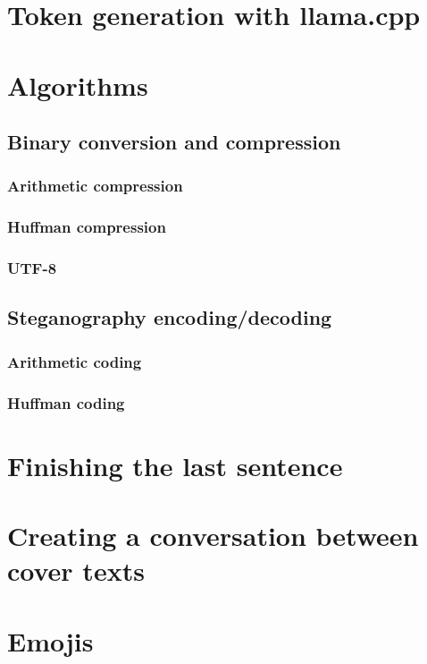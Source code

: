 \section{Token generation with llama.cpp}
\label{sec:tokenGenerationWithLlamaCpp}

\section{Algorithms}
\label{sec:algorithms}

\subsection{Binary conversion and compression}
\label{sec:binaryConversionAndCompression}

\subsubsection{Arithmetic compression}
\label{sec:arithmeticCompression}

\subsubsection{Huffman compression}
\label{sec:huffmanCompression}

\subsubsection{UTF-8}
\label{sec:utf8}

\subsection{Steganography encoding/decoding}
\label{sec:steganographyEncodingDecoding}

\subsubsection{Arithmetic coding}
\label{sec:arithmeticCoding}

\subsubsection{Huffman coding}
\label{sec:huffmanCoding}

\section{Finishing the last sentence}
\label{sec:finishingTheLastSentence}

\section{Creating a conversation between cover texts}
\label{sec:creatingAConversationBetweenCoverTexts}

\section{Emojis}
\label{sec:emojis}
